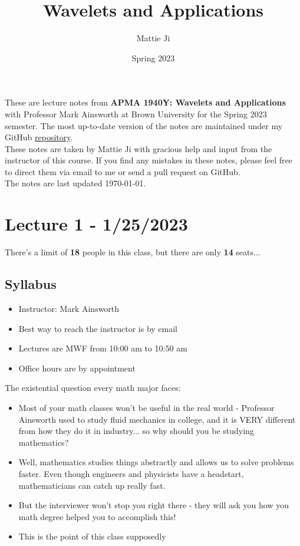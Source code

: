 \documentclass{article}
\title{Wavelets and Applications}
\author{Mattie Ji}
\date{Spring 2023}
\begin{document}
\maketitle
These are lecture notes from \textbf{APMA 1940Y: Wavelets and Applications} with Professor Mark Ainsworth at Brown University for the Spring 2023 semester. The most up-to-date version of the notes are maintained under my GitHub \href{https://github.com/maroon-scorch}{repository}.\\

These notes are taken by Mattie Ji with gracious help and input from the instructor of this course. If you find any mistakes in these notes, please feel free to direct them via email to me or send a pull request on GitHub.\\

The notes are last updated \today.
\tableofcontents
\newpage

\section{Lecture 1 - 1/25/2023}
There's a limit of \textbf{18} people in this class, but there are only \textbf{14} seats...

\subsection{Syllabus}
\begin{itemize}
    \item Instructor: Mark Ainsworth
    \item Best way to reach the instructor is by email
    \item Lectures are MWF from 10:00 am to 10:50 am
    \item Office hours are by appointment
\end{itemize}

The existential question every math major faces:
\begin{itemize}
    \item Most of your math classes won't be useful in the real world - Professor Ainsworth used to study fluid mechanics in college, and it is VERY different from how they do it in industry... so why should you be studying mathematics?
    \item Well, mathematics studies things abstractly and allows us to solve problems faster. Even though engineers and physicists have a headstart, mathematicians can catch up really fast.
    \item But the interviewer won't stop you right there - they will ask you how you math degree helped you to accomplish this! 
    \item This is the point of this class supposedly
\end{itemize}
\end{document}
